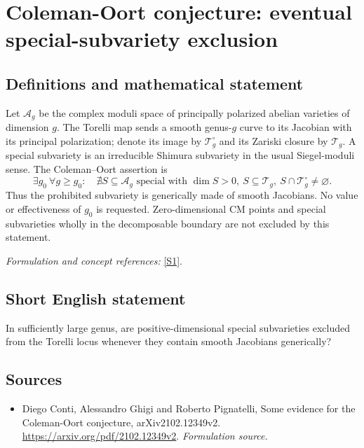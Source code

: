 \documentclass[11pt]{article}
\begin{document}
\section*{\texorpdfstring{Coleman-Oort conjecture: eventual special-subvariety exclusion}{Coleman-Oort conjecture: eventual special-subvariety exclusion}}\label{statement}
\subsection{Definitions and mathematical statement}
Let $\mathcal A_g$ be the complex moduli space of principally polarized abelian varieties of dimension $g$. The Torelli map sends a smooth genus-$g$ curve to its Jacobian with its principal polarization; denote its image by $\mathcal T_g^\circ$ and its Zariski closure by $\mathcal T_g$. A special subvariety is an irreducible Shimura subvariety in the usual Siegel-moduli sense. The Coleman--Oort assertion is
\[
 \exists g_0\ \forall g\ge g_0:\quad
 \nexists S\subseteq\mathcal A_g\text{ special with }
 \dim S>0,\ S\subseteq\mathcal T_g,\ S\cap\mathcal T_g^\circ\ne\varnothing.
\]
Thus the prohibited subvariety is generically made of smooth Jacobians. No value or effectiveness of $g_0$ is requested. Zero-dimensional CM points and special subvarieties wholly in the decomposable boundary are not excluded by this statement.
\par\smallskip\textit{Formulation and concept references:} \href{https://arxiv.org/pdf/2102.12349v2}{[S1]}.

\subsection{Short English statement}
In sufficiently large genus, are positive-dimensional special subvarieties excluded from the Torelli locus whenever they contain smooth Jacobians generically?
\subsection{Sources}
\begin{itemize}
\item[S1]Diego Conti, Alessandro Ghigi and Roberto Pignatelli, Some evidence for the Coleman-Oort conjecture, arXiv2102.12349v2.
\url{https://arxiv.org/pdf/2102.12349v2}.
\textit{Formulation source.}
\end{itemize}
\end{document}
